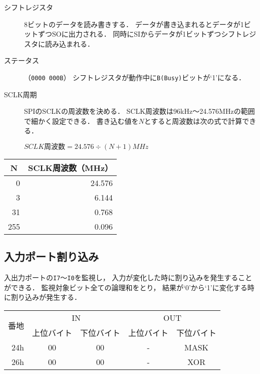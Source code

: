 \begin{description}
\item[シフトレジスタ]
  8ビットのデータを読み書きする．
  データが書き込まれるとデータが1ビットずつSOに出力される．
  同時にSIからデータが1ビットずつシフトレジスタに読み込まれる．
\item[ステータス]（\texttt{0000 000B}）
  シフトレジスタが動作中に\texttt{B(Busy)}ビットが`1'になる．
\item[SCLK周期]
  SPIのSCLKの周波数を決める．
  SCLK周波数は96kHz〜24.576MHzの範囲で細かく設定できる．
  書き込む値を$N$とすると周波数は次の式で計算できる．

  \centerline{$SCLK周波数 = 24.576 \div ( N + 1 ) MHz$}
\end{description}

\begin{center}
  \small\begin{tabular}{ r | r }\hline\hline
  \multicolumn{1}{c|}{N} & \multicolumn{1}{|c}{SCLK周波数（MHz）} \\\hline
  0   & 24.576 \\
  3   &  6.144 \\
  31  &  0.768 \\
  255 &  0.096 \\
  \end{tabular}
\end{center}

\subsection{入力ポート割り込み}
入出力ポートの\texttt{I7}〜\texttt{I0}を監視し，
入力が変化した時に割り込みを発生することができる．
監視対象ビット全ての論理和をとり，
結果が`0'から`1'に変化する時に割り込みが発生する．

\begin{center}
  \small\begin{tabular}{| r | c | c || c | c |}\hline
    \multirow{2}{*}{番地}
    & \multicolumn{2}{|c||}{IN}
    & \multicolumn{2}{c|}{OUT}
    \\\cline{2-5}
         & 上位バイト & 下位バイト & 上位バイト & 下位バイト
    \\\hline\hline
    24h  &  00 & 00
         &  -  & MASK \\\hline
    26h  &  00 & 00
         &  -  & XOR \\\hline
  \end{tabular}
\end{center}

